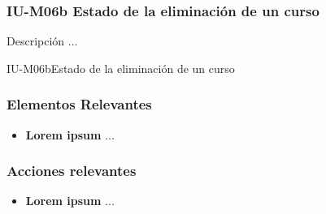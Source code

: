 
\subsubsection{IU-M06b Estado de la eliminación de un curso}

 Descripción ...

        {IU-M06b}{Estado de la eliminación de un curso}

\subsubsection{Elementos Relevantes}

    \begin{itemize}
    \item {\bf Lorem ipsum}
        ...
    \end{itemize}

\subsubsection{Acciones relevantes}

    \begin{itemize}
    \item {\bf Lorem ipsum}
        ...
    \end{itemize}

\clearpage
